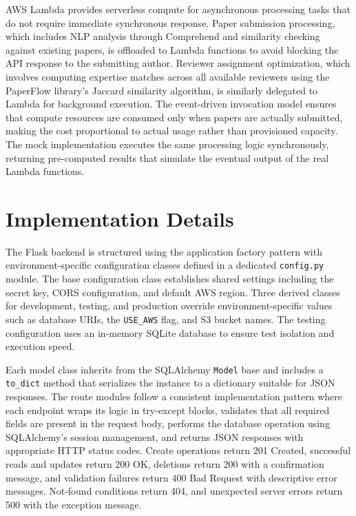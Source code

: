 \documentclass[conference]{IEEEtran}
\begin{document}
AWS Lambda provides serverless compute for asynchronous processing tasks that do not require immediate synchronous response. Paper submission processing, which includes NLP analysis through Comprehend and similarity checking against existing papers, is offloaded to Lambda functions to avoid blocking the API response to the submitting author. Reviewer assignment optimization, which involves computing expertise matches across all available reviewers using the PaperFlow library's Jaccard similarity algorithm, is similarly delegated to Lambda for background execution. The event-driven invocation model ensures that compute resources are consumed only when papers are actually submitted, making the cost proportional to actual usage rather than provisioned capacity. The mock implementation executes the same processing logic synchronously, returning pre-computed results that simulate the eventual output of the real Lambda functions.

\section{Implementation Details}

The Flask backend is structured using the application factory pattern with environment-specific configuration classes defined in a dedicated \texttt{config.py} module. The base configuration class establishes shared settings including the secret key, CORS configuration, and default AWS region. Three derived classes for development, testing, and production override environment-specific values such as database URIs, the \texttt{USE\_AWS} flag, and S3 bucket names. The testing configuration uses an in-memory SQLite database to ensure test isolation and execution speed.

Each model class inherits from the SQLAlchemy \texttt{Model} base and includes a \texttt{to\_dict} method that serializes the instance to a dictionary suitable for JSON responses. The route modules follow a consistent implementation pattern where each endpoint wraps its logic in try-except blocks, validates that all required fields are present in the request body, performs the database operation using SQLAlchemy's session management, and returns JSON responses with appropriate HTTP status codes. Create operations return 201 Created, successful reads and updates return 200 OK, deletions return 200 with a confirmation message, and validation failures return 400 Bad Request with descriptive error messages. Not-found conditions return 404, and unexpected server errors return 500 with the exception message.
\end{document}
